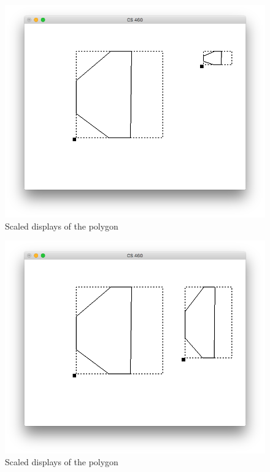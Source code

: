 \documentclass{article}
\begin{document}
\begin{figure}[htb]
\centering
\includegraphics[width=.9\linewidth]{./img/scaled_in.png}
\caption{Scaled displays of the polygon}
\end{figure}
\begin{figure}[htb]
\centering
\includegraphics[width=.9\linewidth]{./img/scaled_out.png}
\caption{Scaled displays of the polygon}
\end{figure}
\end{document}
